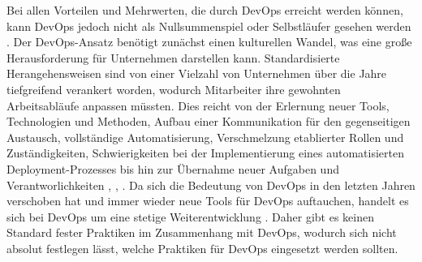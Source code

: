Bei allen Vorteilen und Mehrwerten, die durch DevOps erreicht werden können, kann DevOps jedoch nicht als Nullsummenspiel oder Selbstläufer gesehen werden \cite{humble_why_2011}. Der DevOps-Ansatz benötigt zunächst einen kulturellen Wandel, was eine große Herausforderung für Unternehmen darstellen kann. Standardisierte Herangehensweisen sind von einer Vielzahl von Unternehmen über die Jahre tiefgreifend verankert worden, wodurch Mitarbeiter ihre gewohnten Arbeitsabläufe anpassen müssten. Dies reicht von der Erlernung neuer Tools, Technologien und Methoden, Aufbau einer Kommunikation für den gegenseitigen Austausch, vollständige Automatisierung, Verschmelzung etablierter Rollen und Zuständigkeiten, Schwierigkeiten bei der Implementierung eines automatisierten Deployment-Prozesses bis hin zur Übernahme neuer Aufgaben und Verantworlichkeiten \cite{lwakatare_devops_2019}, \cite[S. 594 - 595]{abrahamsson_product-focused_2016}, \cite[S. 43 - 45]{halstenberg_devops_2020}. Da sich die Bedeutung von DevOps in den letzten Jahren verschoben hat und immer wieder neue Tools für DevOps auftauchen, handelt es sich bei DevOps um eine stetige Weiterentwicklung \cite[S. 595]{abrahamsson_product-focused_2016}. Daher gibt es keinen Standard fester Praktiken im Zusammenhang mit DevOps, wodurch sich nicht absolut festlegen lässt, welche Praktiken für DevOps eingesetzt werden sollten. 









